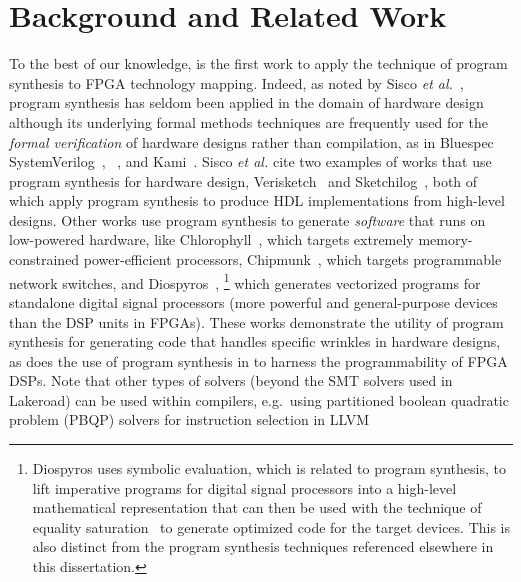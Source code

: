 \chapter{Background and Related Work}
\label{sec:background-and-related-work}

To the best of our knowledge,
  \lr is the first work
  to apply the technique of program synthesis
  to FPGA technology mapping.
Indeed, as noted by Sisco \textit{et al.}~\cite{sisco2022synthesis},
  program synthesis has seldom been applied
  in the domain of hardware design although
  its underlying formal methods techniques
  are frequently used for
  the \textit{formal verification}
  of hardware designs rather than compilation,
  as in Bluespec SystemVerilog~\cite{nikhil2004bluespec},
  \koika~\cite{bourgeat2020essence},
  and Kami~\cite{choi2017kami}.
Sisco \textit{et al.} cite two examples
  of works that use program synthesis for hardware design,
  Verisketch~\cite{ardeshiricham19verisketch} and Sketchilog~\cite{becker14sketchilog},
  both of which apply program synthesis to produce HDL implementations from high-level designs.
Other works use program synthesis
  to generate \textit{software}
  that runs on low-powered hardware,
  like Chlorophyll~\cite{phothilimthana2014chlorophyll},
  which targets extremely memory-constrained
  power-efficient processors,
  Chipmunk~\cite{gao2019chipmunk},
  which targets programmable network switches,
  and Diospyros~\cite{vanhattum2021vectorization},%
  \footnote{Diospyros uses symbolic evaluation, which is related to program synthesis, to lift imperative programs for digital signal processors into a high-level mathematical representation that can then be used with the technique of equality saturation~\cite{tate2011equality} to generate optimized code for the target devices. This is also distinct from the program synthesis techniques referenced elsewhere in this dissertation.}
  which generates vectorized programs for standalone digital signal processors (more powerful and general-purpose devices than the DSP units in FPGAs).
These works demonstrate the utility of program synthesis 
  for generating code that handles
  specific wrinkles in hardware designs,
  as does the use of program synthesis in \lr
  to harness the programmability of FPGA DSPs.
Note that other types of solvers
  (beyond the SMT solvers used in Lakeroad)
  can be used within compilers,
  e.g.~using partitioned boolean quadratic problem
  (PBQP) solvers for instruction selection
  in LLVM~\cite{ebner2008generalized}
  

